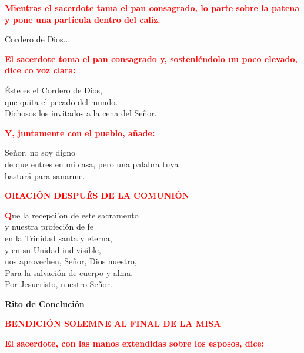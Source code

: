\documentclass[12pt, letterpaper, spanish]{report}
\begin{document}
\large{\bfseries \textcolor{red}{Mientras el sacerdote tama el pan consagrado, lo parte sobre la patena y pone una part\'icula dentro del caliz.}}\newline

\Large Cordero de Dios...\newline

\large{\bfseries \textcolor{red}{El sacerdote toma el pan consagrado y, sosteni\'endolo un poco elevado, dice co voz clara:}}\newline

\Large \'Este es el Cordero de Dios,\\
que quita el pecado del mundo.\\
Dichosos los invitados a la cena del Se\~nor.\newline

\large{\bfseries \textcolor{red}{Y, juntamente con el pueblo, a\~nade:}}\newline

\Large Se\~nor, no soy digno\\
de que entres en mi casa,
pero una palabra tuya\\
bastar\'a para sanarme.\newline

\Large {\bfseries \textcolor{red}{ORACI\'ON DESPU\'ES DE LA COMUNI\'ON}} \newline

\Large \lettrine{\bfseries \textcolor{red}{Q}}{}ue la recepci'on de este sacramento\\
y nuestra profeci\'on de fe\\
en la Trinidad santa y eterna,\\
y en su Unidad indivisible,\\
nos aprovechen, Se\~nor, Dios nuestro,\\
Para la salvaci\'on de cuerpo y alma.\\
Por Jesucristo, nuestro Se\~nor.\newline

\begin{center} 
\Huge {\bfseries Rito de Concluci\'on}
\end{center}

\Large {\bfseries \textcolor{red}{BENDICI\'ON SOLEMNE AL FINAL DE LA MISA}} \newline

\large{\bfseries \textcolor{red}{El sacerdote, con las manos extendidas sobre los esposos, dice:}}\newline
\end{document}
